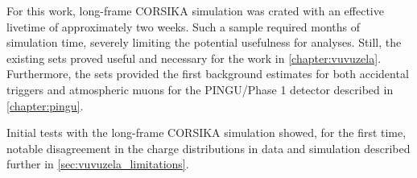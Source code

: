 For this work, long-frame CORSIKA simulation was crated with an effective livetime of approximately two weeks. 
Such a sample required months of simulation time, severely limiting the potential usefulness for analyses.
Still, the existing sets proved useful and necessary for the work in \ref{chapter:vuvuzela}. 
Furthermore, the sets provided the first background estimates for both accidental triggers and atmospheric muons for the PINGU/Phase 1 detector described in \ref{chapter:pingu}.

Initial tests with the long-frame CORSIKA simulation showed, for the first time, notable disagreement in the charge distributions in data and simulation described further in \ref{sec:vuvuzela_limitations}.

